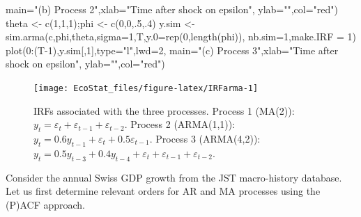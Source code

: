 \documentclass[
  12pt,
]{book}
\newenvironment{Shaded}{\begin{snugshade}}{\end{snugshade}}
\newcommand{\AttributeTok}[1]{\textcolor[rgb]{0.77,0.63,0.00}{#1}}
\newcommand{\DecValTok}[1]{\textcolor[rgb]{0.00,0.00,0.81}{#1}}
\newcommand{\FunctionTok}[1]{\textcolor[rgb]{0.00,0.00,0.00}{#1}}
\newcommand{\NormalTok}[1]{#1}
\newcommand{\OtherTok}[1]{\textcolor[rgb]{0.56,0.35,0.01}{#1}}
\newcommand{\SpecialCharTok}[1]{\textcolor[rgb]{0.00,0.00,0.00}{#1}}
\newcommand{\StringTok}[1]{\textcolor[rgb]{0.31,0.60,0.02}{#1}}
\theoremstyle{definition}
\theoremstyle{definition}
\theoremstyle{definition}
\theoremstyle{definition}
\theoremstyle{remark}
\begin{document}
\begin{Shaded}
\begin{Highlighting}[]
     \AttributeTok{main=}\StringTok{"(b) Process 2"}\NormalTok{,}\AttributeTok{xlab=}\StringTok{"Time after shock on epsilon"}\NormalTok{,}
     \AttributeTok{ylab=}\StringTok{""}\NormalTok{,}\AttributeTok{col=}\StringTok{"red"}\NormalTok{)}
\NormalTok{theta }\OtherTok{\textless{}{-}} \FunctionTok{c}\NormalTok{(}\DecValTok{1}\NormalTok{,}\DecValTok{1}\NormalTok{,}\DecValTok{1}\NormalTok{);phi }\OtherTok{\textless{}{-}} \FunctionTok{c}\NormalTok{(}\DecValTok{0}\NormalTok{,}\DecValTok{0}\NormalTok{,.}\DecValTok{5}\NormalTok{,.}\DecValTok{4}\NormalTok{)}
\NormalTok{y.sim }\OtherTok{\textless{}{-}} \FunctionTok{sim.arma}\NormalTok{(c,phi,theta,}\AttributeTok{sigma=}\DecValTok{1}\NormalTok{,T,}\AttributeTok{y.0=}\FunctionTok{rep}\NormalTok{(}\DecValTok{0}\NormalTok{,}\FunctionTok{length}\NormalTok{(phi)),}
                  \AttributeTok{nb.sim=}\DecValTok{1}\NormalTok{,}\AttributeTok{make.IRF =} \DecValTok{1}\NormalTok{)}
\FunctionTok{plot}\NormalTok{(}\DecValTok{0}\SpecialCharTok{:}\NormalTok{(T}\DecValTok{{-}1}\NormalTok{),y.sim[,}\DecValTok{1}\NormalTok{],}\AttributeTok{type=}\StringTok{"l"}\NormalTok{,}\AttributeTok{lwd=}\DecValTok{2}\NormalTok{,}
     \AttributeTok{main=}\StringTok{"(c) Process 3"}\NormalTok{,}\AttributeTok{xlab=}\StringTok{"Time after shock on epsilon"}\NormalTok{,}
     \AttributeTok{ylab=}\StringTok{""}\NormalTok{,}\AttributeTok{col=}\StringTok{"red"}\NormalTok{)}
\end{Highlighting}
\end{Shaded}

\begin{figure}
\texttt{[image: EcoStat\_files/figure-latex/IRFarma-1]} \caption{IRFs associated with the three processes. Process 1 (MA(2)): $y_t = \varepsilon_t + \varepsilon_{t-1} + \varepsilon_{t-2}$. Process 2 (ARMA(1,1)): $y_{t}=0.6y_{t-1} + \varepsilon_t + 0.5\varepsilon_{t-1}$. Process 3 (ARMA(4,2)): $y_{t}=0.5y_{t-3} + 0.4y_{t-4} + \varepsilon_t + \varepsilon_{t-1} + \varepsilon_{t-2}$.}\label{fig:IRFarma}
\end{figure}

Consider the annual Swiss GDP growth from the JST macro-history database. Let us first determine relevant orders for AR and MA processes using the (P)ACF approach.
\end{document}
